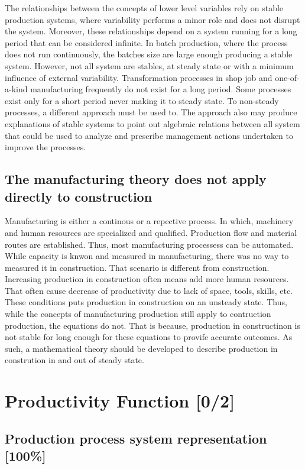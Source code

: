 \documentclass{article}
\begin{document}
The relationships between the concepts of lower level variables rely on stable production systems, where variability performs a minor role and does not disrupt the system.
Moreover, these relationships depend on a system running for a long period that can be considered infinite.
In batch production, where the process does not run continuously, the batches size are large enough producing a stable system.
However, not all system are stables, at steady state or with a minimum influence of external variability.
Transformation processes in shop job and one-of-a-kind manufacturing frequently do not exist for a long period.
Some processes exist only for a short period never making it to steady state.
To non-steady processes, a different approach must be used to.
The approach also may produce explanations of stable systems to point out algebraic relations between all system that could be used to analyze and prescribe management actions undertaken to improve the processes.

\subsection{The manufacturing theory does not apply directly to construction}
\label{sec:orgd6b7c76}
Manufacturing is either a continous or a repective process.
In which, machinery and human resources are specialized and qualified.
Production flow and material routes are established. 
Thus, most manufacturing processess can be automated.
While capacity is knwon and measured in manufacturing, there was no way to measured it in construction.
That scenario is different from construction.
Increasing production in construction often means add more human resources.
That often cause decrease of productivity due to lack of space, tools, skills, etc.
These conditions puts production in construction on an unsteady state.
Thus, while the concepts of manufacturing production still apply to contruction production, the equations do not.
That is because, production in constructinon is not stable for long enough for these equations to provife accurate outcomes.
As such, a mathematical theory should be developed to describe production in constrution in and out of steady state.

\section{Productivity Function [0/2]}
\label{sec:org4c75e49}
\subsection{Production process system representation [100\%]}
\label{sec:orgea4d9e0}
\end{document}

